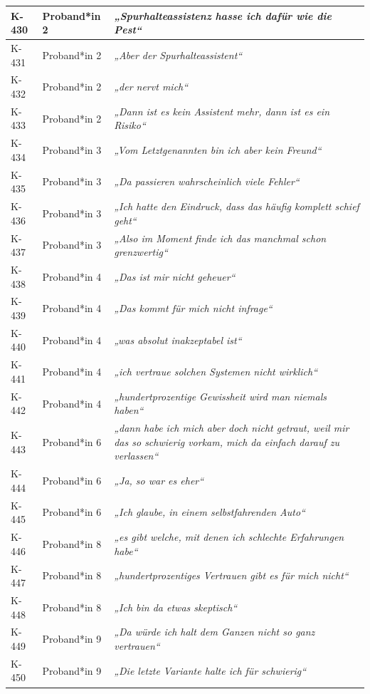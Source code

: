 {\begin{xltabular}{\textwidth}{
    |P{0.10\textwidth}
    |P{0.17\textwidth}
    |Y|
}
K-430 & Proband*in 2 & \textit{„Spurhalteassistenz hasse ich dafür wie die Pest“} \\
\hline
K-431 & Proband*in 2 & \textit{„Aber der Spurhalteassistent“} \\
\hline
K-432 & Proband*in 2 & \textit{„der nervt mich“} \\
\hline
K-433 & Proband*in 2 & \textit{„Dann ist es kein Assistent mehr, dann ist es ein Risiko“} \\
\hline
K-434 & Proband*in 3 & \textit{„Vom Letztgenannten bin ich aber kein Freund“} \\
\hline
K-435 & Proband*in 3 & \textit{„Da passieren wahrscheinlich viele Fehler“} \\
\hline
K-436 & Proband*in 3 & \textit{„Ich hatte den Eindruck, dass das häufig komplett schief geht“} \\
\hline
K-437 & Proband*in 3 & \textit{„Also im Moment finde ich das manchmal schon grenzwertig“} \\
\hline
K-438 & Proband*in 4 & \textit{„Das ist mir nicht geheuer“} \\
\hline
K-439 & Proband*in 4 & \textit{„Das kommt für mich nicht infrage“} \\
\hline
K-440 & Proband*in 4 & \textit{„was absolut inakzeptabel ist“} \\
\hline
K-441 & Proband*in 4 & \textit{„ich vertraue solchen Systemen nicht wirklich“} \\
\hline
K-442 & Proband*in 4 & \textit{„hundertprozentige Gewissheit wird man niemals haben“} \\
\hline
K-443 & Proband*in 6 & \textit{„dann habe ich mich aber doch nicht getraut, weil mir das so schwierig vorkam, mich da einfach darauf zu verlassen“} \\
\hline
K-444 & Proband*in 6 & \textit{„Ja, so war es eher“} \\
\hline
K-445 & Proband*in 6 & \textit{„Ich glaube, in einem selbstfahrenden Auto“} \\
\hline
K-446 & Proband*in 8 & \textit{„es gibt welche, mit denen ich schlechte Erfahrungen habe“} \\
\hline
K-447 & Proband*in 8 & \textit{„hundertprozentiges Vertrauen gibt es für mich nicht“} \\
\hline
K-448 & Proband*in 8 & \textit{„Ich bin da etwas skeptisch“} \\
\hline
K-449 & Proband*in 9 & \textit{„Da würde ich halt dem Ganzen nicht so ganz vertrauen“} \\
\hline
K-450 & Proband*in 9 & \textit{„Die letzte Variante halte ich für schwierig“} \\

\end{xltabular}}
